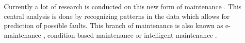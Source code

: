 Currently a lot of research is conducted on this new form of maintenance \citep{muller2008concept}. This central analysis is done by recognizing patterns in the data which allows for prediction of possible faults. This branch of maintenance is also known as e-maintenance \citep{yu2003multi}, condition-based maintenance or intelligent maintenance \citep{vermaak2007multi}.







